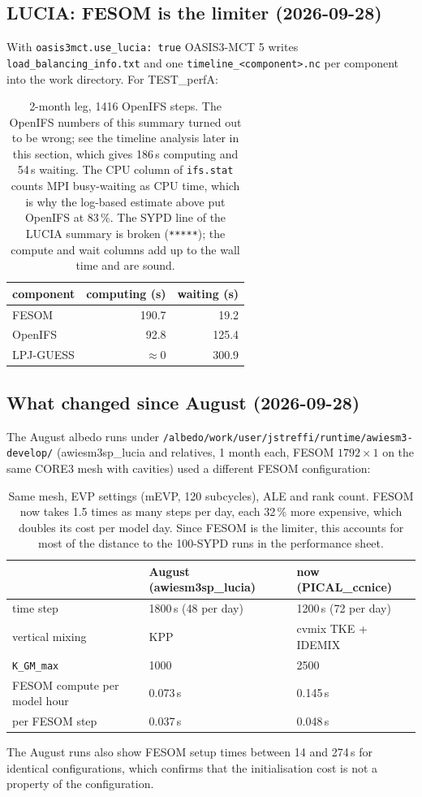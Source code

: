 \documentclass[11pt,a4paper]{article}
\begin{document}
\subsection{LUCIA: FESOM is the limiter (2026-09-28)}
With \texttt{oasis3mct.use\_lucia: true} OASIS3-MCT 5 writes \texttt{load\_balancing\_info.txt} and one \texttt{timeline\_<component>.nc} per component into the work directory. For TEST\_perfA:
\begin{table}[H]\centering\small
\begin{tabular}{lrr}\toprule
component & computing (s) & waiting (s)\\\midrule
FESOM & 190.7 & 19.2\\
OpenIFS & 92.8 & 125.4\\
LPJ-GUESS & $\approx 0$ & 300.9\\\bottomrule
\end{tabular}
\caption{2-month leg, 1416 OpenIFS steps. The OpenIFS numbers of this summary turned out to be wrong; see the timeline analysis later in this section, which gives 186\,s computing and 54\,s waiting. The CPU column of \texttt{ifs.stat} counts MPI busy-waiting as CPU time, which is why the log-based estimate above put OpenIFS at 83\,\%. The SYPD line of the LUCIA summary is broken (\texttt{*****}); the compute and wait columns add up to the wall time and are sound.}
\end{table}

\subsection{What changed since August (2026-09-28)}
The August albedo runs under \texttt{/albedo/work/user/jstreffi/runtime/awiesm3-develop/} (awiesm3sp\_lucia and relatives, 1 month each, FESOM $1792\times1$ on the same CORE3 mesh with cavities) used a different FESOM configuration:
\begin{table}[H]\centering\small
\begin{tabular}{lll}\toprule
 & August (awiesm3sp\_lucia) & now (PICAL\_ccnice)\\\midrule
time step & 1800\,s (48 per day) & 1200\,s (72 per day)\\
vertical mixing & KPP & cvmix TKE + IDEMIX\\
\texttt{K\_GM\_max} & 1000 & 2500\\
FESOM compute per model hour & 0.073\,s & 0.145\,s\\
per FESOM step & 0.037\,s & 0.048\,s\\\bottomrule
\end{tabular}
\caption{Same mesh, EVP settings (mEVP, 120 subcycles), ALE and rank count. FESOM now takes 1.5 times as many steps per day, each 32\,\% more expensive, which doubles its cost per model day. Since FESOM is the limiter, this accounts for most of the distance to the 100-SYPD runs in the performance sheet.}
\end{table}
The August runs also show FESOM setup times between 14 and 274\,s for identical configurations, which confirms that the initialisation cost is not a property of the configuration.
\end{document}
